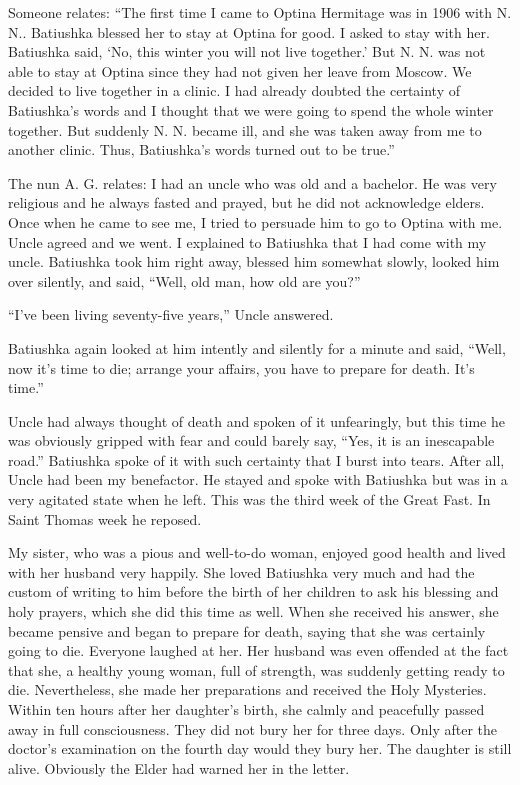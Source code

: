 Someone relates: ``The first time I came to Optina Hermitage was in 1906 with N. N.. Batiushka blessed her to stay at Optina for good. I asked to stay with her. Batiushka said, `No, this winter you will not live together.' But N. N. was not able to stay at Optina since they had not given her leave from Moscow. We decided to live together in a clinic. I had already doubted the certainty of Batiushka's words and I thought that we were going to spend the whole winter together. But suddenly N. N. became ill, and she was taken away from me to another clinic. Thus, Batiushka's words turned out to be true.''


\begin{longquote}{The nun A. G. relates: }
I had an uncle who was old and a bachelor. He was very religious and he always fasted and prayed, but he did not acknowledge elders. Once when he came to see me, I tried to persuade him to go to Optina with me. Uncle agreed and we went. I explained to Batiushka that I had come with my uncle. Batiushka took him right away, blessed him somewhat slowly, looked him over silently, and said, ``Well, old man, how old are you?''

``I've been living seventy-five years,'' Uncle answered.

Batiushka again looked at him intently and silently for a minute and said, ``Well, now it's time to die; arrange your affairs, you have to prepare for death. It's time.''

Uncle had always thought of death and spoken of it unfearingly, but this time he was obviously gripped with fear and could barely say, ``Yes, it is an inescapable road.'' Batiushka spoke of it with such certainty that I burst into tears. After all, Uncle had been my benefactor. He stayed and spoke with Batiushka but was in a very agitated state when he left. This was the third week of the Great Fast. In Saint Thomas week he reposed.

My sister, who was a pious and well-to-do woman, enjoyed good health and lived with her husband very happily. She loved Batiushka very much and had the custom of writing to him before the birth of her children to ask his blessing and holy prayers, which she did this time as well. When she received his answer, she became pensive and began to prepare for death, saying that she was certainly going to die. Everyone laughed at her. Her husband was even offended at the fact that she, a healthy young woman, full of strength, was suddenly getting ready to die. Nevertheless, she made her preparations and received the Holy Mysteries. Within ten hours after her daughter's birth, she calmly and peacefully passed away in full consciousness. They did not bury her for three days. Only after the doctor's examination on the fourth day would they bury her. The daughter is still alive. Obviously the Elder had warned her in the letter.
\end{longquote}


